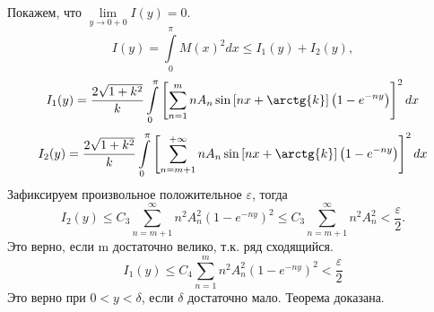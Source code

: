 \documentclass[9pt]{article}
\begin{document}
	Покажем, что $\lim\limits_{y \to 0 + 0} I(y) = 0$.
	\begin{equation*}
		I(y)  = \int\limits_0^\pi M(x)^2 dx \leq I_1(y) + I_2(y),
	\end{equation*}
	\begin{equation*}
		I_1(y) = \dfrac{2\sqrt{1 + k^2}}{k} \int\limits_0^\pi\left[\sum\limits_{n=1}^{m} n A_n \sin{\left[nx + \arctg{k}\right]} \left(1 - e^{-ny}\right)\right]^2 dx
	\end{equation*}
	\begin{equation*}
		I_2(y) = \dfrac{2\sqrt{1 + k^2}}{k} \int\limits_0^\pi\left[\sum\limits_{n=m+1}^{+\infty} n A_n \sin{\left[nx + \arctg{k}\right]} \left(1 - e^{-ny}\right)\right]^2 dx
	\end{equation*}
	Зафиксируем произвольное положительное $\varepsilon$, тогда
	\begin{equation*}
		I_2(y) \leq C_3 \sum\limits_{n=m+1}^{\infty} n^2 A_n^2 (1 - e^{-ny})^2 \leq C_3 \sum\limits_{n=m+1}^{\infty} n^2 A_n^2 < \dfrac{\varepsilon}{2}.
	\end{equation*}
	Это верно, если m достаточно велико, т.к. ряд сходящийся.
	\begin{equation*}
		I_1(y) \leq C_4 \sum\limits_{n=1}^{m} n^2 A_n^2 (1 - e^{-ny})^2 < \dfrac{\varepsilon}{2}
	\end{equation*}
	Это верно при $0 < y < \delta$, если $\delta$ достаточно мало. Теорема доказана.
	
\end{document}
